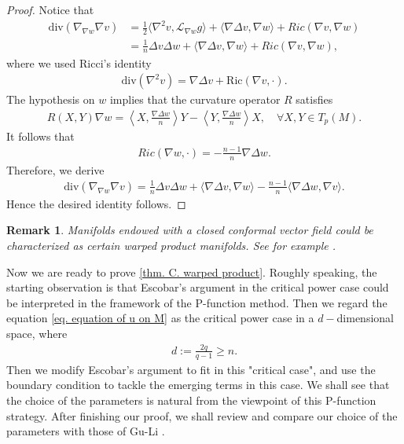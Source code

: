 \documentclass[12pt]{amsart}%
\newtheorem{remark}{Remark}
\numberwithin{equation}{section}
\numberwithin{lemma}{section}
\numberwithin{proposition}{section}
\numberwithin{corollary}{section}
\numberwithin{remark}{section}
\begin{document}
\begin{proof}
    Notice that
    \begin{align*}
        \mathrm{div}(\nabla_{\nabla w}\nabla v)
        &=\frac{1}{2}\langle \nabla^2 v,\mathcal{L}_{\nabla w}g\rangle
        +\langle\nabla\Delta v,\nabla w\rangle
        +Ric(\nabla v,\nabla w)\\
        &=\frac{1}{n}\Delta v\Delta w
        +\langle\nabla\Delta v,\nabla w\rangle
        +Ric(\nabla v,\nabla w),
    \end{align*}
    where we used Ricci's identity
    \begin{align*}
        \mathrm{div}(\nabla^2 v)=\nabla \Delta v+\mathrm{Ric}(\nabla v,\cdot).
    \end{align*}
    The hypothesis on $w$ implies that the curvature operator $R$ satisfies
    \begin{align*}
        R(X,Y)\nabla w=\left\langle X, \frac{\nabla \Delta w}{n}\right\rangle Y
        -\left\langle Y, \frac{\nabla \Delta w}{n}\right\rangle X,\quad \forall X,Y\in T_p(M).
    \end{align*}
    It follows that 
    \begin{align*}
        Ric(\nabla w,\cdot)=-\frac{n-1}{n}\nabla \Delta w.
    \end{align*}
    Therefore, we derive
    \begin{align*}
        \mathrm{div}(\nabla_{\nabla w}\nabla v)
        =\frac{1}{n}\Delta v\Delta w
        +\langle\nabla\Delta v,\nabla w\rangle
        -\frac{n-1}{n}\langle\nabla \Delta w,\nabla v\rangle.
    \end{align*}
    Hence the desired identity follows.
\end{proof}
\begin{remark}
    Manifolds endowed with a closed conformal vector field could be characterized as certain warped product manifolds. See for example \cite[Theorem 1.1]{CMM12}.
\end{remark}

Now we are ready to prove \cref{thm. C. warped product}.
Roughly speaking, the starting observation is that Escobar's argument in the critical power case \cite{Esc90} could be interpreted in the framework of the P-function method. Then we regard the equation \cref{eq. equation of u on M} as the  critical power case in a $d-$dimensional space, where \begin{align}\label{eq. intrinsic dimension}
    d:=\frac{2q}{q-1}\geq n.
\end{align}
 Then we modify Escobar's argument \cite{Esc90} to fit in this "critical case", and use the boundary condition to tackle the emerging terms in this case. We shall see that the choice of the parameters is natural from the viewpoint of this P-function strategy. After finishing our proof, we shall review and compare our choice of the parameters with those of Gu-Li \cite{GL25}.
\end{document}
